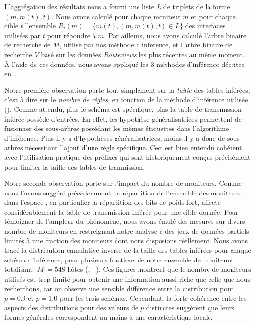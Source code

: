 L'aggrégation des résultats nous a fourni une liste $L$ de triplets de la forme
$(m, m(t), t)$. Nous avons calculé pour chaque moniteur $m$ et pour chaque cible
$t$ l'ensemble $R_t(m) = \{ m(t), (m, m(t), t) \in L \}$ des interfaces utilisées
par $t$ pour répondre à $m$. Par ailleurs, nous avons calculé l'arbre binaire de
recherche de $M$, utilisé par nos méthode d'inférence, et l'arbre binaire de
recherche $V$ basé sur les données {\em Routeviews} les plus récentes au même
moment. À l'aide de ces données, nous avons appliqué les 3 méthodes d'inférence
décrites en~.


Notre première observation porte tout simplement sur la {\em taille} des tables
inférées, c'est à dire sur le {\em nombre de règles}, en fonction de la méthode
d'inférence utilisée (). Comme attendu, plus le
schéma est spécifique, plus la table de transmission inférée possède d'entrées.
En effet, les hypothèse généralisatrices permettent de fusionner des sous-arbres
possédant les mêmes étiquettes dans l'algorithme d'inférence. Plus il y a
d'hypothèses généralisatrices, moins il y a donc de sous-arbres nécessitant
l'ajout d'une règle spécifique. Ceci est bien entendu cohérent avec
l'utilisation pratique des préfixes \cidr qui sont historiquement conçus
précisément pour limiter la taille des tables de tranmission.

Notre seconde observation porte sur l'impact du nombre de moniteurs. Comme nous
l'avons suggéré précédemment, la répartition de l'ensemble des moniteurs dans
l'espace \ip, en particulier la répartition des bits de poids fort, affecte
considérablement la table de transmission inférée pour une cible donnée. Pour
témoigner de l'ampleur du phénomène, nous avons émulé des mesures sur divers
nombre de moniteurs en restreignant notre analyse à des jeux de données partiels
limités à une fraction des moniteurs dont nous disposions réellement. Nous avons
tracé la distribution cumulative inverse de la taille des tables inférées pour
chaque schéma d'inférence, pour plusieurs fractions de notre ensemble de
moniteurs totalisant $|M| = 548$ hôtes 
(,
,
). Ces figures montrent que le nombre de
moniteurs utilisés est trop limité pour obtenir une information aussi riche que
celle que nous recherchons, car on observe une sensible différence entre la
distribution pour $p = 0.9$ et $p = 1.0$ pour les trois schémas. Cependant, la
forte cohérence entre les aspects des distributions pour des valeurs de $p$
distinctes suggèrent que leurs formes générales correspondent au moins à une
caractéristique locale. 

